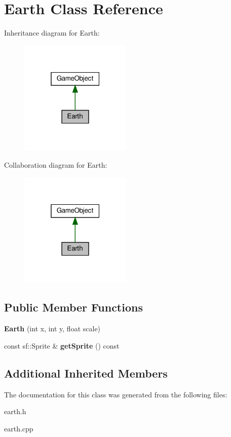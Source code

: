\hypertarget{class_earth}{}\section{Earth Class Reference}
\label{class_earth}


Inheritance diagram for Earth\+:
\nopagebreak
\begin{figure}[H]
\begin{center}
\leavevmode
\includegraphics[width=151pt]{class_earth__inherit__graph}
\end{center}
\end{figure}


Collaboration diagram for Earth\+:
\nopagebreak
\begin{figure}[H]
\begin{center}
\leavevmode
\includegraphics[width=151pt]{class_earth__coll__graph}
\end{center}
\end{figure}
\subsection*{Public Member Functions}
\begin{DoxyCompactItemize}
\item 
\mbox{\label{class_earth_a9686e201e5d06af7befbe9c0d6b80e37}} 
{\bfseries Earth} (int x, int y, float scale)
\item 
\mbox{\label{class_earth_add06e4af293b3723bf6ceae4c3c3834c}} 
const sf\+::\+Sprite \& {\bfseries get\+Sprite} () const
\end{DoxyCompactItemize}
\subsection*{Additional Inherited Members}


The documentation for this class was generated from the following files\+:\begin{DoxyCompactItemize}
\item 
earth.\+h\item 
earth.\+cpp\end{DoxyCompactItemize}
